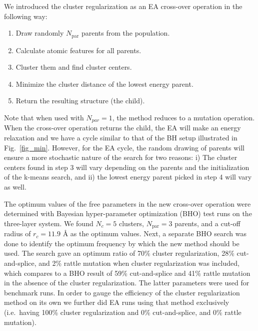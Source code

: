 \documentclass[aip,amsmath,amssymb,reprint]{revtex4-1}
\begin{document}
We introduced the cluster regularization as an EA cross-over operation in the following way:
\begin{enumerate}
\item Draw randomly $N_\mathrm{par}$ parents from the population.
\item Calculate atomic features for all parents.
\item Cluster them and find cluster centers.
\item Minimize the cluster distance of the lowest energy parent.
\item Return the resulting structure (the child).
\end{enumerate}
Note that when used with $N_{par}=1$, the method reduces to a mutation operation.
When the cross-over operation returns the child, the EA will make an energy
relaxation and we have a cycle similar to that of the BH setup
illustrated in Fig.\  \ref{fig_min}. However, for the EA cycle, the
random drawing of parents will ensure a more stochastic nature of the
search for two reasons: i) The cluster centers found in step 3 will vary depending on the
parents and the initialization of the k-means search, and ii) the lowest energy parent
picked in step 4 will vary as well.

The optimum values of the free parameters in the new cross-over operation were
determined with Bayesian hyper-parameter optimization (BHO) test runs on the three-layer system. We found $N_c=5$ clusters, $N_\mathrm{par}=3$
parents, and a cut-off radius of $r_c=11.9$ {\AA} as the optimum
values. Next, a separate BHO search was done to identify the optimum
frequency by which the new method should be used. The search gave an
optimum ratio of 70\% cluster regularization, 28\% cut-and-splice, and 2\%
rattle mutation when cluster regularization was included, which
compares to a BHO result of 59\% cut-and-splice and
41\% rattle mutation in the absence of the cluster regularization. The
latter parameters were used for benchmark runs. In order to gauge the efficiency of
the cluster regularization method on its own we further did EA runs
using that method exclusively (i.e.\ having 100\% cluster
regularization and 0\% cut-and-splice, and 0\% rattle mutation).
\end{document}
